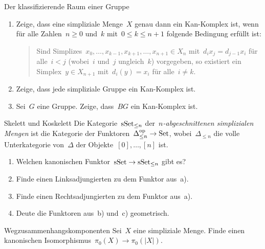 \documentclass{uebblatt}
\begin{document}

\begin{aufgabe}{Der klassifizierende Raum einer Gruppe}
\begin{enumerate}
\item Zeige, dass eine simpliziale Menge~$X$ genau dann ein Kan-Komplex ist,
wenn für alle Zahlen~$n \geq 0$ und~$k$ mit~$0 \leq k \leq n + 1$ folgende Bedingung erfüllt ist:
\begin{quote}Sind Simplizes~$x_0,\ldots,x_{k-1},x_{k+1},\ldots,x_{n+1} \in X_n$
mit~$d_i x_j = d_{j-1} x_i$ für alle~$i < j$ (wobei~$i$ und~$j$ ungleich~$k$)
vorgegeben, so existiert ein Simplex~$y \in X_{n+1}$ mit~$d_i(y) = x_i$ für
alle~$i \neq k$.\end{quote}
\item Zeige, dass jede simpliziale Gruppe ein Kan-Komplex ist.
\item Sei~$G$ eine Gruppe. Zeige, dass~$BG$ ein Kan-Komplex ist.
\end{enumerate}
\end{aufgabe}

\begin{aufgabe}{Skelett und Koskelett}
Die Kategorie~$\mathrm{sSet}_{\leq n}$ der~\emph{$n$-abgeschnittenen simplizialen Mengen}
ist die Kategorie der Funktoren~$\Delta_{\leq n}^{\mathrm{op}} \to \mathrm{Set}$,
wobei~$\Delta_{\leq n}$ die volle Unterkategorie von~$\Delta$ der
Objekte~$[0],\ldots,[n]$ ist.
\begin{enumerate}
\item Welchen kanonischen Funktor~$\mathrm{sSet} \to \mathrm{sSet}_{\leq n}$ gibt es?
\item Finde einen Linksadjungierten zu dem Funktor aus~a).
\item Finde einen Rechtsadjungierten zu dem Funktor aus~a).
\item Deute die Funktoren aus~b) und~c) geometrisch.
\end{enumerate}
\end{aufgabe}

\begin{aufgabe}{Wegzusammenhangskomponenten}
Sei~$X$ eine simpliziale Menge. Finde einen kanonischen Isomorphismus~$\pi_0(X)
\to \pi_0(|X|)$.
\end{aufgabe}
\end{document}
